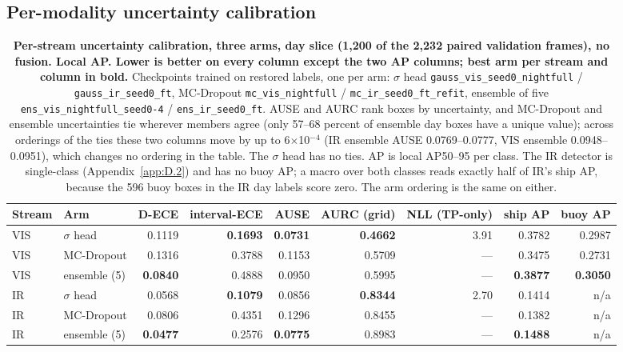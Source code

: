 \documentclass[10pt]{article}
\begin{document}
\subsection{Per-modality uncertainty calibration}\label{app:E.1}
\begin{table}[htbp]
\centering
\footnotesize
\caption{\textbf{Per-stream uncertainty calibration, three arms, day slice (1,200 of the 2,232 paired validation frames), no fusion. Local AP. Lower is better on every column except the two AP columns; best arm per stream and column in bold.} Checkpoints trained on restored labels, one per arm: $\sigma$ head \texttt{gauss\_\allowbreak{}vis\_\allowbreak{}seed0\_\allowbreak{}nightfull} / \texttt{gauss\_\allowbreak{}ir\_\allowbreak{}seed0\_\allowbreak{}ft}, MC-Dropout \texttt{mc\_\allowbreak{}vis\_\allowbreak{}nightfull} / \texttt{mc\_\allowbreak{}ir\_\allowbreak{}seed0\_\allowbreak{}ft\_\allowbreak{}refit}, ensemble of five \texttt{ens\_\allowbreak{}vis\_\allowbreak{}nightfull\_\allowbreak{}seed0-4} / \texttt{ens\_\allowbreak{}ir\_\allowbreak{}seed0\_\allowbreak{}ft}. AUSE and AURC rank boxes by uncertainty, and MC-Dropout and ensemble uncertainties tie wherever members agree (only 57--68 percent of ensemble day boxes have a unique value); across orderings of the ties these two columns move by up to 6$\times$10$^{-4}$ (IR ensemble AUSE 0.0769--0.0777, VIS ensemble 0.0948--0.0951), which changes no ordering in the table. The $\sigma$ head has no ties. AP is local AP50--95 per class. The IR detector is single-class (Appendix~\ref{app:D.2}) and has no buoy AP; a macro over both classes reads exactly half of IR's ship AP, because the 596 buoy boxes in the IR day labels score zero. The arm ordering is the same on either.}
\label{tab:9}
\setlength{\tabcolsep}{3pt}
\begin{adjustbox}{max width=\linewidth}
\begin{tabular}{llrrrrrrr}
\toprule
Stream & Arm & D-ECE & interval-ECE & AUSE & AURC (grid) & NLL (TP-only) & ship AP & buoy AP \\
\midrule
VIS & $\sigma$ head & 0.1119 & \textbf{0.1693} & \textbf{0.0731} & \textbf{0.4662} & 3.91 & 0.3782 & 0.2987 \\
VIS & MC-Dropout & 0.1316 & 0.3788 & 0.1153 & 0.5709 & --- & 0.3475 & 0.2731 \\
VIS & ensemble (5) & \textbf{0.0840} & 0.4888 & 0.0950 & 0.5995 & --- & \textbf{0.3877} & \textbf{0.3050} \\
IR & $\sigma$ head & 0.0568 & \textbf{0.1079} & 0.0856 & \textbf{0.8344} & 2.70 & 0.1414 & n/a \\
IR & MC-Dropout & 0.0806 & 0.4351 & 0.1296 & 0.8455 & --- & 0.1382 & n/a \\
IR & ensemble (5) & \textbf{0.0477} & 0.2576 & \textbf{0.0775} & 0.8983 & --- & \textbf{0.1488} & n/a \\
\bottomrule
\end{tabular}
\end{adjustbox}
\end{table}
\end{document}
